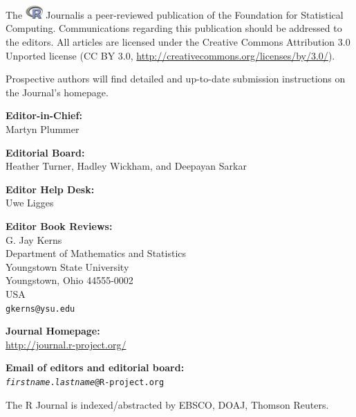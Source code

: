 \documentclass[a4paper,twoside]{report}
\begin{document}
\date{Month Year} %
\titlepage
\sectionhead{}

\vspace*{1in}
\begin{center}
\begin{minipage}{0.65\textwidth}
{\Large The  \includegraphics[height=5mm]{Rlogo} Journal}\quad is a peer-reviewed publication of
    the \R{} Foundation for Statistical Computing. Communications
    regarding this publication should be addressed to the editors. All
    articles are licensed under the Creative Commons Attribution 3.0 Unported
    license (CC BY 3.0, \url{http://creativecommons.org/licenses/by/3.0/}).
    \bigskip

    Prospective authors will find detailed and up-to-date submission
    instructions on the Journal's homepage.

\bigskip
    \begin{center}
      \textbf{Editor-in-Chief:}\\
      Martyn Plummer

    \bigskip
      \textbf{Editorial Board:}\\
      Heather Turner, Hadley Wickham, and Deepayan Sarkar
    
    
    \bigskip
      \textbf{Editor Help Desk:}\\
      Uwe Ligges

    \bigskip
      \textbf{Editor Book Reviews:}\\
      G. Jay Kerns\\
      Department of Mathematics and Statistics\\
      Youngstown State University\\
      Youngstown, Ohio 44555-0002\\
      USA\\
      \texttt{gkerns@ysu.edu}

    \bigskip
    \textbf{\R{} Journal Homepage:}\\
    \url{http://journal.r-project.org/}
    
    \bigskip
    \textbf{Email of editors and editorial board:}\\
    \texttt{\textit{firstname}.\textit{lastname}@R-project.org}

    \bigskip The R Journal is indexed/abstracted by EBSCO, DOAJ, Thomson Reuters.  
      
  \end{center}
    
  \end{minipage}
\end{center}
  
\end{document}
